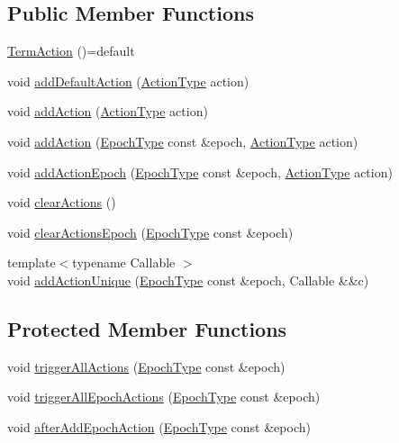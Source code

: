 \subsection*{Public Member Functions}
\begin{DoxyCompactItemize}
\item 
\hyperlink{structvt_1_1term_1_1_term_action_ac0b0f4271452cfbea674c6a7c4f50a4b}{Term\+Action} ()=default
\item 
void \hyperlink{structvt_1_1term_1_1_term_action_a9e9e174482720b4886ea4e8c38ead0d7}{add\+Default\+Action} (\hyperlink{namespacevt_ae0a5a7b18cc99d7b732cb4d44f46b0f3}{Action\+Type} action)
\item 
void \hyperlink{structvt_1_1term_1_1_term_action_a1227042cb4eb38937fb8ed34bcbdf998}{add\+Action} (\hyperlink{namespacevt_ae0a5a7b18cc99d7b732cb4d44f46b0f3}{Action\+Type} action)
\item 
void \hyperlink{structvt_1_1term_1_1_term_action_a15b79357805676e1ff2f880b02fd4061}{add\+Action} (\hyperlink{namespacevt_a81d11b28122d43bf9834577e4a06440f}{Epoch\+Type} const \&epoch, \hyperlink{namespacevt_ae0a5a7b18cc99d7b732cb4d44f46b0f3}{Action\+Type} action)
\item 
void \hyperlink{structvt_1_1term_1_1_term_action_a2429a48171da578d25d7672486a24b51}{add\+Action\+Epoch} (\hyperlink{namespacevt_a81d11b28122d43bf9834577e4a06440f}{Epoch\+Type} const \&epoch, \hyperlink{namespacevt_ae0a5a7b18cc99d7b732cb4d44f46b0f3}{Action\+Type} action)
\item 
void \hyperlink{structvt_1_1term_1_1_term_action_aa5ec547b72f5da20aa4bee7cab6d3f35}{clear\+Actions} ()
\item 
void \hyperlink{structvt_1_1term_1_1_term_action_a942136955ad91cd2e464e05956115ed3}{clear\+Actions\+Epoch} (\hyperlink{namespacevt_a81d11b28122d43bf9834577e4a06440f}{Epoch\+Type} const \&epoch)
\item 
{\footnotesize template$<$typename Callable $>$ }\\void \hyperlink{structvt_1_1term_1_1_term_action_a3ccd1689f56ab62821cfa6b1e65fc60b}{add\+Action\+Unique} (\hyperlink{namespacevt_a81d11b28122d43bf9834577e4a06440f}{Epoch\+Type} const \&epoch, Callable \&\&c)
\end{DoxyCompactItemize}
\subsection*{Protected Member Functions}
\begin{DoxyCompactItemize}
\item 
void \hyperlink{structvt_1_1term_1_1_term_action_a0cf69a46cb567f12844745cb37a91971}{trigger\+All\+Actions} (\hyperlink{namespacevt_a81d11b28122d43bf9834577e4a06440f}{Epoch\+Type} const \&epoch)
\item 
void \hyperlink{structvt_1_1term_1_1_term_action_a23cc1dcce197af4e2e81fa659d952d94}{trigger\+All\+Epoch\+Actions} (\hyperlink{namespacevt_a81d11b28122d43bf9834577e4a06440f}{Epoch\+Type} const \&epoch)
\item 
void \hyperlink{structvt_1_1term_1_1_term_action_a873f01594c4c30233ea9a409b2067150}{after\+Add\+Epoch\+Action} (\hyperlink{namespacevt_a81d11b28122d43bf9834577e4a06440f}{Epoch\+Type} const \&epoch)
\end{DoxyCompactItemize}
